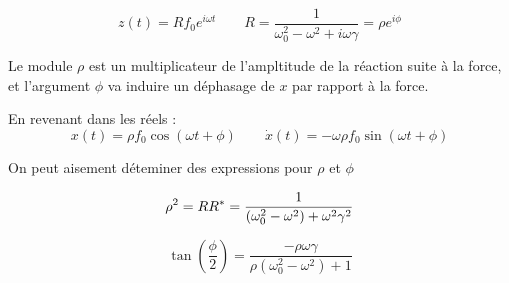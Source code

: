 \begin{equation}
    z(t) = R f_0 e^{i \omega t} \qquad R = \frac{1}{\omega_0^2 - \omega^2 + i\omega\gamma} = \rho e^{i\phi}
\end{equation}

Le module $\rho$ est un multiplicateur de l’ampltitude de la réaction suite à la force, et l’argument $\phi$ va induire un déphasage de $x$ par rapport à la force.

En revenant dans les réels :
\begin{equation}
    x(t) = \rho f_0 \cos(\omega t + \phi)
    \qquad \dot{x}(t) = -\omega \rho f_0 \sin(\omega t + \phi)
\end{equation}

On peut aisement déteminer des expressions pour $\rho$ et $\phi$

\begin{dmath}
    \rho^2 = RR^* \\
    = \frac{1}{(\omega_0^2 - \omega^2) + \omega^2\gamma^2}
\end{dmath}

\begin{dmath}
    \tan(\frac{\phi}{2}) = \frac{-\rho\omega\gamma}{\rho(\omega_0^2 - \omega^2) + 1}
\end{dmath}

